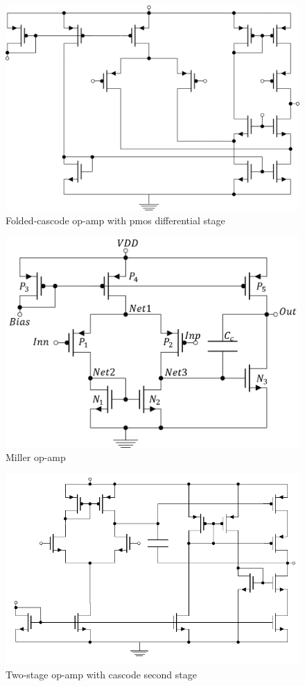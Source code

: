 \begin{figure}[H]
	\centering
	\includegraphics[width=0.7\linewidth]{Fig/FoldedCascodeOpAmpPmosDiffStage.png}
	\caption{Folded-cascode op-amp with pmos differential stage} \label{fig:foldedCascodeOpAmpPMOS}
\end{figure}

\begin{figure}[H]
	\centering
	\includegraphics[width=0.65\linewidth]{Fig/Miller.png}
	\caption{Miller op-amp} \label{fig:MillerOpAmp}
\end{figure}

\begin{figure}[H]
	\centering
	\includegraphics[width=0.8\linewidth]{Fig/TwoStageOpAmpWithCascodeSecondStage}
	\caption{Two-stage op-amp with cascode second stage} \label{fig:TwoStageOpAmpWithCascodeSecondStage}
\end{figure}

